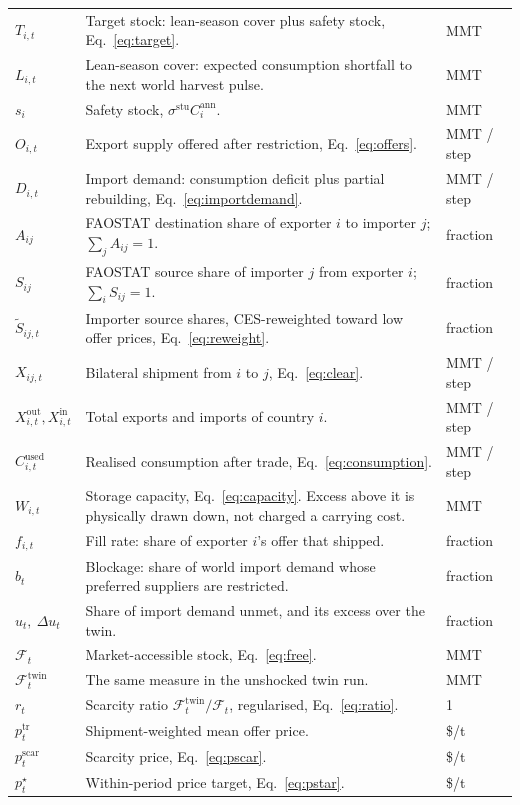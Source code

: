 \begin{longtable}{>{\raggedright}p{}
                 >{\raggedright}p{}
                 p{}}
\(T_{i,t}\) & Target stock: lean-season cover plus safety stock, Eq.~\eqref{eq:target}. & MMT \\
\(L_{i,t}\) & Lean-season cover: expected consumption shortfall to the next world harvest pulse. & MMT \\
\(s_i\) & Safety stock, \(\sigma^{\mathrm{stu}}C^{\mathrm{ann}}_i\). & MMT \\
\(O_{i,t}\) & Export supply offered after restriction, Eq.~\eqref{eq:offers}. & MMT / step \\
\(D_{i,t}\) & Import demand: consumption deficit plus partial rebuilding, Eq.~\eqref{eq:importdemand}. & MMT / step \\
\(A_{ij}\) & FAOSTAT destination share of exporter \(i\) to importer \(j\); \(\sum_j A_{ij}=1\). & fraction \\
\(S_{ij}\) & FAOSTAT source share of importer \(j\) from exporter \(i\); \(\sum_i S_{ij}=1\). & fraction \\
\(\tilde S_{ij,t}\) & Importer source shares, CES-reweighted toward low offer prices, Eq.~\eqref{eq:reweight}. & fraction \\
\(X_{ij,t}\) & Bilateral shipment from \(i\) to \(j\), Eq.~\eqref{eq:clear}. & MMT / step \\
\(X^{\mathrm{out}}_{i,t},X^{\mathrm{in}}_{i,t}\) & Total exports and imports of country \(i\). & MMT / step \\
\(C^{\mathrm{used}}_{i,t}\) & Realised consumption after trade, Eq.~\eqref{eq:consumption}. & MMT / step \\
\(W_{i,t}\) & Storage capacity, Eq.~\eqref{eq:capacity}. Excess above it is physically drawn down, not charged a carrying cost. & MMT \\
\(f_{i,t}\) & Fill rate: share of exporter \(i\)'s offer that shipped. & fraction \\
\(b_t\) & Blockage: share of world import demand whose preferred suppliers are restricted. & fraction \\
\(u_t,\ \Delta u_t\) & Share of import demand unmet, and its excess over the twin. & fraction \\
\(\mathcal{F}_t\) & Market-accessible stock, Eq.~\eqref{eq:free}. & MMT \\
\(\mathcal{F}^{\mathrm{twin}}_t\) & The same measure in the unshocked twin run. & MMT \\
\(r_t\) & Scarcity ratio \(\mathcal{F}^{\mathrm{twin}}_t/\mathcal{F}_t\), regularised, Eq.~\eqref{eq:ratio}. & 1 \\
\(p^{\mathrm{tr}}_t\) & Shipment-weighted mean offer price. & \$/t \\
\(p^{\mathrm{scar}}_t\) & Scarcity price, Eq.~\eqref{eq:pscar}. & \$/t \\
\(p^{\star}_t\) & Within-period price target, Eq.~\eqref{eq:pstar}. & \$/t \\
\bottomrule
\end{longtable}


